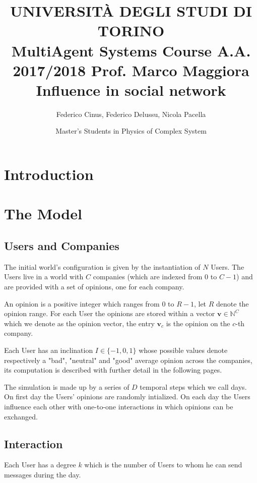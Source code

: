 \documentclass[11pt,a4paper]{article}
\author{Federico Cinus, Federico Delussu, Nicola Pacella}
\author{Master’s Students in Physics of Complex System}
\title{ \LARGE{UNIVERSIT\`{A} DEGLI STUDI DI TORINO} 
\\
MultiAgent Systems Course A.A. 2017/2018 Prof. Marco Maggiora
\\
 \textbf{Influence in social network}}
\begin{document}
\date{}
\maketitle
\bigskip


\tableofcontents

\newpage 
\section{Introduction}

\section{The Model}

\subsection{Users and Companies}

The initial world's configuration is given by the instantiation of $N$ Users. 
The Users live in a world with $C$ companies (which are indexed from $0$ to $C-1$) and are provided with a set of opinions, one for each company.

An opinion is a positive integer which ranges from $0$ to $R-1$, let $R$ denote the opinion range. For each User the opinions are stored within a vector $ \mathbf{v} \in \mathbb{N}^C$ which we denote as the opinion vector, the entry $  \mathbf{v}_c $ is the opinion on the $c$-th company.

Each User has an inclination $I \in \{-1,0,1\}$ whose possible values denote respectively a "bad", "neutral" and "good" average opinion across the companies, its computation is described with further detail in the following pages.
  
The simulation is made up by a series of $D$ temporal steps which we call days. 
On first day the Users' opinions are randomly intialized. 
On each day the Users influence each other with one-to-one interactions in which opinions can be exchanged.

\subsection{Interaction}

Each User has a degree $k$ which is the number of Users to whom he can send messages during the day.
\end{document}
